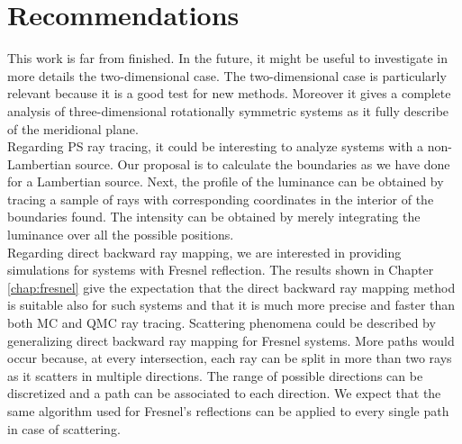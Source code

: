\section{Recommendations}
This work is far from finished. In the future, it might be useful to investigate in more details the two-dimensional case. The two-dimensional case is particularly relevant because it is a good test for new methods. Moreover it gives a complete analysis of three-dimensional rotationally symmetric systems as it fully describe of the meridional plane.\\ \indent 
Regarding PS ray tracing, it could be interesting to analyze systems with a non-Lambertian source. Our proposal is to calculate the boundaries as we have done for a Lambertian source. Next, the profile of the luminance can be obtained by tracing a sample of rays with corresponding coordinates in the interior of the boundaries found. The intensity can be obtained by merely integrating the luminance over all the possible positions. \\ \indent 
Regarding direct backward ray mapping, we are interested in providing simulations for systems with Fresnel reflection. The results shown in Chapter \ref{chap:fresnel} give the expectation that the direct backward ray mapping method is suitable also for such systems and that it is much more precise and faster than both MC and QMC ray tracing. Scattering phenomena could be described by generalizing direct backward ray mapping for Fresnel systems. More paths would occur because, at every intersection, each ray can be split in more than two rays as it scatters in multiple directions. The range of possible directions can be discretized and a path can be associated to each direction. We expect that the same algorithm used for Fresnel's reflections can be applied to every single path in case of scattering.
